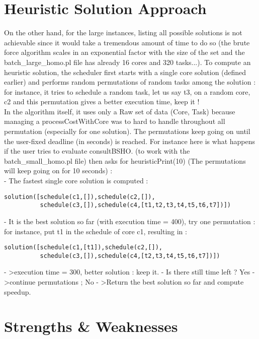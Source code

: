 \documentclass[11pt, a4paper, margin = 1.3cm]{article}
\begin{document}
\section{Heuristic Solution Approach}

On the other hand, for the large instances, listing all possible solutions is not achievable since it would take a tremendous amount of time to do so (the brute force algorithm scales in an exponential factor with the size of the set and the batch\_large\_homo.pl file has already 16 cores and 320 tasks...). To compute an heuristic solution, the scheduler first starts with a single core solution (defined earlier) and performs random permutations of random tasks among the solution : for instance, it tries to schedule a random task, let us say t3, on a random core, c2 and this permutation gives a better execution time, keep it ! \\

In the algorithm itself, it uses only a Raw set of data (Core, Task) because managing a processCostWithCore was to hard to handle throughout all permutation (especially for one solution). The permutations keep going on until the user-fixed deadline (in seconds) is reached. For instance here is what happens if the user tries to evaluate consultBSHO. (to work with the batch\_small\_homo.pl file) then asks for heuristicPrint(10) (The permutations will keep going on for 10 seconds) : \\

\noindent  - The fastest single core solution is computed :
\begin{verbatim}
solution([schedule(c1,[]),schedule(c2,[]),
	      schedule(c3,[]),schedule(c4,[t1,t2,t3,t4,t5,t6,t7])])
\end{verbatim}
- It is the best solution so far (with execution time = 400), try one permutation : for instance, put t1 in the schedule of core c1, resulting in : 
\begin{verbatim}
solution([schedule(c1,[t1]),schedule(c2,[]),
	      schedule(c3,[]),schedule(c4,[t2,t3,t4,t5,t6,t7])])
\end{verbatim}
- \textgreater execution time = 300, better solution : keep it. \newline
- Is there still time left ? Yes - \textgreater  continue permutations ; No - \textgreater  Return the best solution so far and compute speedup. 

\section{Strengths \& Weaknesses}
\end{document}
